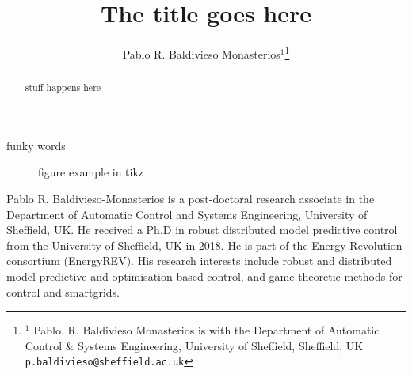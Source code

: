 \documentclass[journal, final, letterpaper]{IEEEtran}
\begin{document}
\title{The title goes here}
%



\author{Pablo R. Baldivieso Monasterios$^{1}$\thanks{$^{1}$ Pablo. R. Baldivieso Monasterios is with the Department of Automatic Control \& Systems Engineering, University of Sheffield, Sheffield, UK {\tt\footnotesize p.baldivieso@sheffield.ac.uk}}
}
\maketitle

\begin{abstract}
stuff happens here
\end{abstract}

\begin{IEEEkeywords}
funky words
\end{IEEEkeywords}


\cite{Limon2009}

\begin{figure}[b!]
  \centering
  
  \caption{figure example in tikz}
  \label{fig:trial}
\end{figure}



\begin{IEEEbiography}{Pablo R. Baldivieso-Monasterios} is a post-doctoral research associate in the Department of Automatic Control and Systems Engineering, University of Sheffield, UK. He received a Ph.D in robust distributed model predictive control from the University of Sheffield, UK in 2018. He is part of the Energy Revolution consortium (EnergyREV). His research interests include robust and distributed model predictive and optimisation-based control, and game theoretic methods for control and smartgrids.
\end{IEEEbiography}
\end{document}

